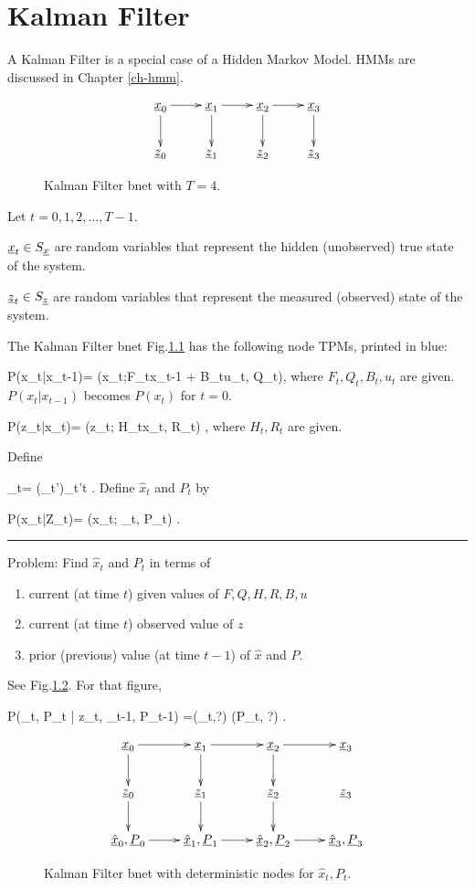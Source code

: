 \chapter{Kalman Filter}\label{ch-kalman}

A Kalman Filter is a special case of a
Hidden Markov Model. HMMs are
 discussed in Chapter \ref{ch-hmm}.

\begin{figure}[h!]
\centering
$$\xymatrix{
\rvx_0\ar[d]\ar[r]&
\rvx_1\ar[d]\ar[r]&
\rvx_2\ar[d]\ar[r]&
\rvx_3\ar[d]\\
\rvz_0&
\rvz_1&
\rvz_2&
\rvz_3
}$$
\caption{Kalman Filter bnet with $T=4$.}
\label{fig-kal}
\end{figure}

Let $t=0, 1, 2, \dots , T-1$.

${\underline{x}}_t\in S_{\underline{x}}$ are
random variables that represent
the hidden (unobserved) true
state of the system.

${\underline{z}}_t\in S_{\underline{z}}$ are 
random variables that represent
the measured (observed) state of the system.


The Kalman Filter bnet Fig.\ref{fig-kal}
has the following
node TPMs,
printed in blue:


\beq\color{blue}
P(x_t|x_{t-1})=
\caln(x_t;F_tx_{t-1} + B_tu_t, Q_t)\;,
\eeq
where $F_t, Q_t, B_t, u_t$
are given. $P(x_t|x_{t-1})$ becomes $P(x_t)$
for $t=0$.

\beq\color{blue}
P(z_t|x_t)=
\caln(z_t; H_tx_t, R_t)
\;,
\eeq
where $H_t, R_t$ are given.

Define

\beq
\rvZ_t= (\rvz_{t'})_{t'\leq t}
\;.
\eeq
Define $\hat{x}_t$ and $P_t$ by

\beq
P(x_t|Z_t)=
\caln(x_t; _t, P_t)
\;.
\eeq
\hrule
\medskip
\noindent
Problem: Find $\hat{x}_t$ and $P_t$
in terms of 
\begin{enumerate}
\item
 current (at time $t$)
 given values of
$F,Q,H,R,
 B ,u$
\item
 current (at time $t$)
observed  value of 
$z$
\item
prior (previous)
value (at time $t-1$) of $\hat{x}$
and $P$.
\end{enumerate}
See Fig.\ref{fig-kal-plus}.
For that figure,

\beq \color{blue}
P(_t, P_t | z_t,
_{t-1}, P_{t-1})
=\delta(_t,?)
\delta(P_t, ?)
\;.
\eeq

\begin{figure}[h!]
\centering
$$\xymatrix{
\rvx_0\ar[d]\ar[r]&
\rvx_1\ar[d]\ar[r]&
\rvx_2\ar[d]\ar[r]&
\rvx_3\\
\rvz_0\ar[d]&
\rvz_1\ar[d]&
\rvz_2\ar[d]&
\rvz_3\\
\ul{\hat{x}}_0, 
\ul{P}_0\ar[r]&
\ul{\hat{x}}_1, 
\ul{P}_1\ar[r]&
\ul{\hat{x}}_2, 
\ul{P}_2\ar[r]&
\ul{\hat{x}}_3, 
\ul{P}_3
}$$
\caption{Kalman Filter bnet
with deterministic nodes for 
$\hat{x}_t, P_t$.}
\label{fig-kal-plus}
\end{figure}

